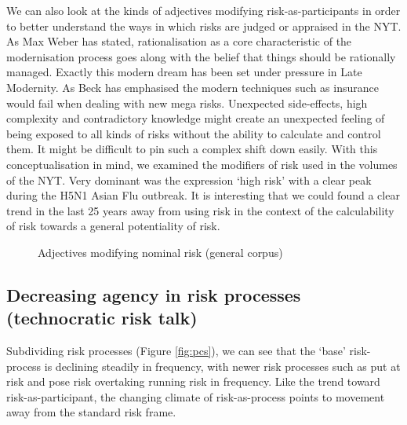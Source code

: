 We can also look at the kinds of adjectives modifying risk-as-participants in order to better understand the ways in which risks are judged or appraised in the NYT. As Max Weber has stated, rationalisation as a core characteristic of the modernisation process goes along with the belief that things should be rationally managed. Exactly this modern dream has been set under pressure in Late Modernity. As Beck has emphasised the modern techniques such as insurance would fail when dealing with new mega risks. Unexpected side-effects, high complexity and contradictory knowledge might create an unexpected feeling of being exposed to all kinds of risks without the ability to calculate and control them. It might be difficult to pin such a complex shift down easily. With this conceptualisation in mind, we examined the modifiers of risk used in the volumes of the NYT. Very dominant was the expression `high risk' with a clear peak during the H5N1 Asian Flu outbreak. It is interesting that we could found a clear trend in the last 25 years away from using risk in the context of the calculability of risk towards a general potentiality of risk.

\begin{figure}[htb!]
\centering
{}
\caption{Adjectives modifying nominal risk (general corpus)}
\end{figure}

\subsection{Decreasing agency in risk processes (technocratic risk talk)}

Subdividing risk processes (Figure \ref{fig:pcs}), we can see that the `base' risk-process is declining steadily in frequency, with newer risk processes such as put at risk and pose risk overtaking running risk in frequency. Like the trend toward risk-as-participant, the changing climate of risk-as-process points to movement away from the standard risk frame. 

